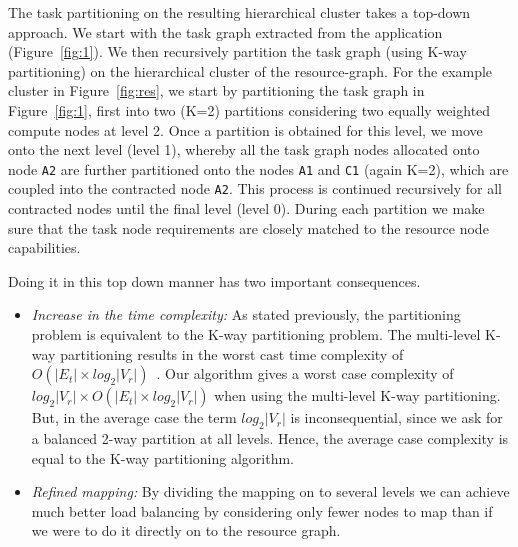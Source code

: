 The task partitioning on the resulting hierarchical cluster takes a
top-down approach. We start with the task graph extracted from the
application (Figure~\ref{fig:1}). We then recursively partition the task
graph (using K-way partitioning) on the hierarchical cluster of the
resource-graph. For the example cluster in Figure~\ref{fig:res}, we
start by partitioning the task graph in Figure~\ref{fig:1}, first into
two (K=2) partitions considering two equally weighted compute nodes at
level 2. Once a partition is obtained for this level, we move onto the
next level (level 1), whereby all the task graph nodes allocated onto
node \texttt{A2} are further partitioned onto the nodes \texttt{A1} and
\texttt{C1} (again K=2), which are coupled into the contracted node
\texttt{A2}. This process is continued recursively for all contracted
nodes until the final level (level 0). During each partition we make
sure that the task node requirements are closely matched to the resource
node capabilities.


Doing it in this top down manner has two important consequences.

\begin{itemize}

\item \textit{Increase in the time complexity:} As stated previously,
  the partitioning problem is equivalent to the K-way partitioning
  problem. The multi-level K-way partitioning results in the worst cast
  time complexity of $O(|E_t| \times log_2|V_r|)$~\cite{gkar98}. Our
  algorithm gives a worst case complexity of \mbox{$log_2|V_r| \times
    O(|E_t| \times log_2 |V_r|)$} when using the multi-level K-way
  partitioning. But, in the average case the term $log_2|V_r|$ is
  inconsequential, since we ask for a balanced 2-way partition at all
  levels. Hence, the average case complexity is equal to the K-way
  partitioning algorithm.

\item \textit{Refined mapping:} By dividing the mapping on to several
  levels we can achieve much better load balancing by considering only
  fewer nodes to map than if we were to do it directly on to the
  resource graph. %

\end{itemize}



